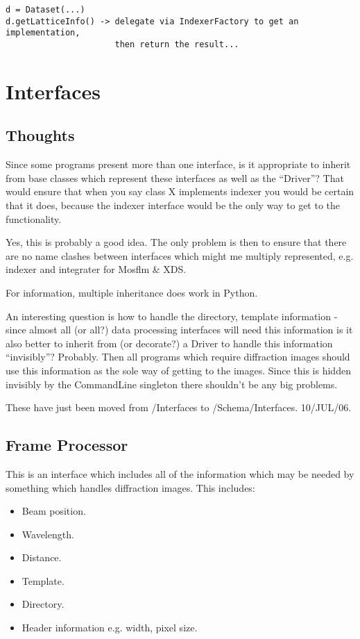 \documentclass[a4paper, 11pt]{article}
\begin{document}
{
\tiny
\begin{verbatim}
d = Dataset(...)
d.getLatticeInfo() -> delegate via IndexerFactory to get an implementation,
                      then return the result...
\end{verbatim}
}


\section{Interfaces}

\subsection{Thoughts}

Since some programs present more than one interface, is it appropriate to
inherit from base classes which represent these interfaces as well as 
the ``Driver''? That would ensure that when you say class X implements 
indexer you would be certain that it does, because the indexer interface
would be the only way to get to the functionality.

Yes, this is probably a good idea. The only problem is then to ensure that
there are no name clashes between interfaces which might me multiply 
represented, e.g. indexer and integrater for Mosflm \& XDS.

For information, multiple inheritance does work in Python.

An interesting question is how to handle the directory, template information - 
since almost all (or all?) data processing interfaces will need this
information is it also better to inherit from (or decorate?) a Driver to
handle this information ``invisibly''? Probably. Then all programs which 
require diffraction images should use this information as the sole way of
getting to the images. Since this is hidden invisibly by the CommandLine
singleton there shouldn't be any big problems.

These have just been moved from /Interfaces to /Schema/Interfaces. 10/JUL/06.

\subsection{Frame Processor}

This is an interface which includes all of the information which may be needed
by something which handles diffraction images. This includes:

\begin{itemize}
\item{Beam position.}
\item{Wavelength.}
\item{Distance.}
\item{Template.}
\item{Directory.}
\item{Header information e.g. width, pixel size.}
\end{itemize}
\end{document}

